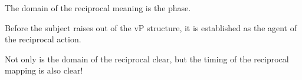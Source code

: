 \documentclass[a0paper,landscape,columns=2]{../includes/tex/baposter}
\begin{document}
\begin{poster}
{The domain of the reciprocal meaning is the phase.

\vspace{.1in}

Before the subject raises out of the vP structure, it is established as the
agent of the reciprocal action.

\vspace{.1in}

Not only is the domain of the reciprocal clear, but the timing of the reciprocal mapping is also clear!

\vspace{.05in}

}





%
%




%
%











%
%



%
%




\end{poster}
\end{document}
